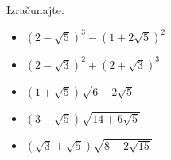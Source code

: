 \begin{multicols}{2}
        
        
            \begin{naloga}
                Izračunajte.
                \begin{itemize}
                        \item $\left(2-\sqrt{5}\right)^3-\left(1+2\sqrt{5}\right)^2$ 
                        \item $\left(2-\sqrt{3}\right)^2+\left(2+\sqrt{3}\right)^3$ 
                        \item $\left(1+\sqrt{5}\right)\sqrt{6-2\sqrt{5}}$ 
                        \item $\left(3-\sqrt{5}\right)\sqrt{14+6\sqrt{5}}$ 
                        \item $\left(\sqrt{3}+\sqrt{5}\right)\sqrt{8-2\sqrt{15}}$ 
                \end{itemize}
            \end{naloga}

            ~~\\~~\\~~\\~~\\~~\\~~\\~~\\~~\\~~\\~~\\~~\\
            
        \end{multicols}








